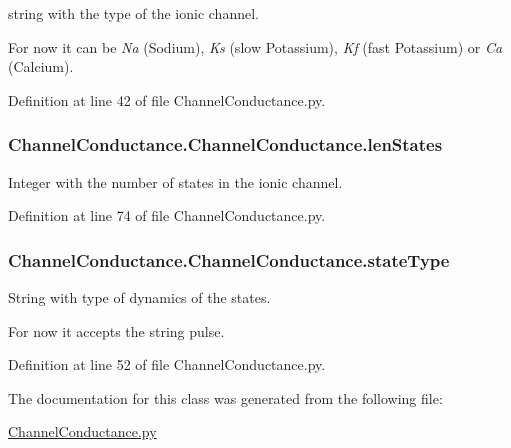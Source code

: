 string with the type of the ionic channel. 

For now it can be {\itshape Na} (Sodium), {\itshape Ks} (slow Potassium), {\itshape Kf} (fast Potassium) or {\itshape Ca} (Calcium). 

Definition at line 42 of file Channel\-Conductance.\-py.

\hypertarget{class_channel_conductance_1_1_channel_conductance_ae217799d13e5d225af048b7ba503fde1}{
\subsubsection[{len\-States}]{\setlength{\rightskip}{0pt plus 5cm}Channel\-Conductance.\-Channel\-Conductance.\-len\-States}}\label{class_channel_conductance_1_1_channel_conductance_ae217799d13e5d225af048b7ba503fde1}


Integer with the number of states in the ionic channel. 



Definition at line 74 of file Channel\-Conductance.\-py.

\hypertarget{class_channel_conductance_1_1_channel_conductance_aa3c889bb4528c3abe7b69862cf87119d}{
\subsubsection[{state\-Type}]{\setlength{\rightskip}{0pt plus 5cm}Channel\-Conductance.\-Channel\-Conductance.\-state\-Type}}\label{class_channel_conductance_1_1_channel_conductance_aa3c889bb4528c3abe7b69862cf87119d}


String with type of dynamics of the states. 

For now it accepts the string pulse. 

Definition at line 52 of file Channel\-Conductance.\-py.



The documentation for this class was generated from the following file\-:\begin{DoxyCompactItemize}
\item 
\hyperlink{_channel_conductance_8py}{Channel\-Conductance.\-py}\end{DoxyCompactItemize}
